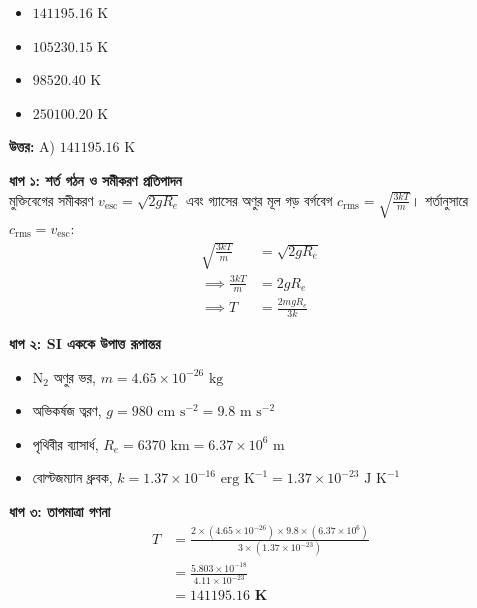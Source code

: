 \documentclass[12pt, a4paper]{article}
\begin{document}
\begin{itemize}[label={}, leftmargin=1cm, itemsep=0.5em]
    \item[\textbf{A)}] $141195.16\text{ K}$
    \item[\textbf{B)}] $105230.15\text{ K}$
    \item[\textbf{C)}] $98520.40\text{ K}$
    \item[\textbf{D)}] $250100.20\text{ K}$
\end{itemize}

\vspace{0.5em}
\begin{tcolorbox}[answerbox]
    \textbf{\color{success} উত্তর:} A) $141195.16\text{ K}$
\end{tcolorbox}
\vspace{1em}

\begin{tcolorbox}[solutionbox={সমাধান (Solution)}]
    \noindent
    \textbf{ধাপ ১: শর্ত গঠন ও সমীকরণ প্রতিপাদন} \\
    মুক্তিবেগের সমীকরণ $v_{\text{esc}} = \sqrt{2 g R_e}$ এবং গ্যাসের অণুর মূল গড় বর্গবেগ $c_{\text{rms}} = \sqrt{\frac{3kT}{m}}$। শর্তানুসারে $c_{\text{rms}} = v_{\text{esc}}$:
    \begin{align*}
        \sqrt{\frac{3kT}{m}} &= \sqrt{2 g R_e} \\
        \implies \frac{3kT}{m} &= 2 g R_e \\
        \implies T &= \frac{2 m g R_e}{3 k}
    \end{align*}
    
    \vspace{0.4em}
    \noindent\textbf{ধাপ ২: SI এককে উপাত্ত রূপান্তর}
    \begin{itemize}[leftmargin=1.5em, itemsep=0.2em]
        \item $\text{N}_2$ অণুর ভর, $m = 4.65 \times 10^{-26}\text{ kg}$
        \item অভিকর্ষজ ত্বরণ, $g = 980\text{ cm s}^{-2} = 9.8\text{ m s}^{-2}$
        \item পৃথিবীর ব্যাসার্ধ, $R_e = 6370\text{ km} = 6.37 \times 10^6\text{ m}$
        \item বোল্টজম্যান ধ্রুবক, $k = 1.37 \times 10^{-16}\text{ erg K}^{-1} = 1.37 \times 10^{-23}\text{ J K}^{-1}$
    \end{itemize}
    
    \vspace{0.4em}
    \noindent\textbf{ধাপ ৩: তাপমাত্রা গণনা}
    \begin{align*}
        T &= \frac{2 \times (4.65 \times 10^{-26}) \times 9.8 \times (6.37 \times 10^6)}{3 \times (1.37 \times 10^{-23})} \\
        &= \frac{5.803 \times 10^{-18}}{4.11 \times 10^{-23}} \\
        &= \mathbf{141195.16\text{ K}}
    \end{align*}
\end{tcolorbox}
\end{document}
